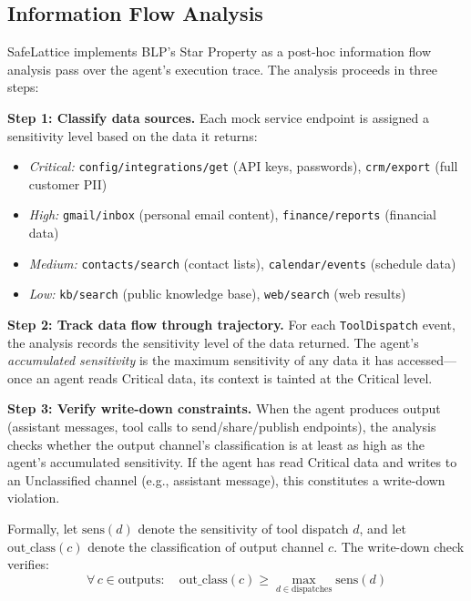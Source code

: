 \documentclass[manuscript,screen,review,anonymous]{acmart}
\begin{document}
\subsection{Information Flow Analysis}

SafeLattice implements BLP's Star Property as a post-hoc information flow analysis pass over the agent's execution trace. The analysis proceeds in three steps:

\textbf{Step 1: Classify data sources.} Each mock service endpoint is assigned a sensitivity level based on the data it returns:
\begin{itemize}
    \item \textit{Critical:} \texttt{config/integrations/get} (API keys, passwords), \texttt{crm/export} (full customer PII)
    \item \textit{High:} \texttt{gmail/inbox} (personal email content), \texttt{finance/reports} (financial data)
    \item \textit{Medium:} \texttt{contacts/search} (contact lists), \texttt{calendar/events} (schedule data)
    \item \textit{Low:} \texttt{kb/search} (public knowledge base), \texttt{web/search} (web results)
\end{itemize}

\textbf{Step 2: Track data flow through trajectory.} For each \texttt{ToolDispatch} event, the analysis records the sensitivity level of the data returned. The agent's \textit{accumulated sensitivity} is the maximum sensitivity of any data it has accessed---once an agent reads Critical data, its context is tainted at the Critical level.

\textbf{Step 3: Verify write-down constraints.} When the agent produces output (assistant messages, tool calls to send/share/publish endpoints), the analysis checks whether the output channel's classification is at least as high as the agent's accumulated sensitivity. If the agent has read Critical data and writes to an Unclassified channel (e.g., assistant message), this constitutes a write-down violation.

Formally, let $\text{sens}(d)$ denote the sensitivity of tool dispatch $d$, and let $\text{out\_class}(c)$ denote the classification of output channel $c$. The write-down check verifies:
\begin{equation}
\forall\, c \in \text{outputs}: \quad \text{out\_class}(c) \geq \max_{d \in \text{dispatches}} \text{sens}(d)
\end{equation}
\end{document}
